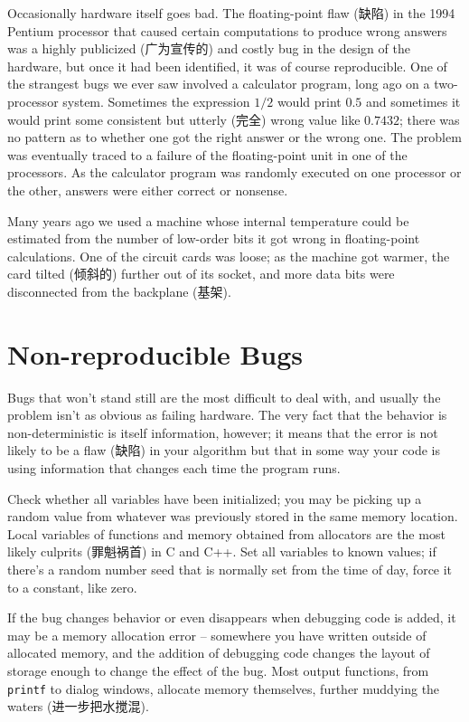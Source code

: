 Occasionally hardware itself goes bad. The floating-point flaw (缺陷) in
the 1994 Pentium processor that caused certain computations to produce
wrong answers was a highly publicized (广为宣传的) and costly bug in the
design of the hardware, but once it had been identified, it was of course
reproducible.  One of the strangest bugs we ever saw involved a calculator
program, long ago on a two-processor system.  Sometimes the expression
$1/2$ would print $0.5$ and sometimes it would print some consistent but
utterly (完全) wrong value like $0.7432$; there was no pattern as to
whether one got the right answer or the wrong one. The problem was
eventually traced to a failure of the floating-point unit in one of the
processors. As the calculator program was randomly executed on one
processor or the other, answers were either correct or nonsense.

Many years ago we used a machine whose internal temperature could be
estimated from the number of low-order bits it got wrong in floating-point
calculations. One of the circuit cards was loose; as the machine got
warmer, the card tilted (倾斜的) further out of its socket, and more data
bits were disconnected from the backplane (基架).

\section{Non-reproducible Bugs}

Bugs that won't stand still are the most difficult to deal with, and
usually the problem isn't as obvious as failing hardware. The very fact
that the behavior is non-deterministic is itself information, however; it
means that the error is not likely to be a flaw (缺陷) in your algorithm
but that in some way your code is using information that changes each time
the program runs.

Check whether all variables have been initialized; you may be picking up a
random value from whatever was previously stored in the same memory
location.  Local variables of functions and memory obtained from allocators
are the most likely culprits (罪魁祸首) in C and C++. Set all variables to
known values; if there's a random number seed that is normally set from the
time of day, force it to a constant, like zero.

If the bug changes behavior or even disappears when debugging code is
added, it may be a memory allocation error -- somewhere you have written
outside of allocated memory, and the addition of debugging code changes the
layout of storage enough to change the effect of the bug. Most output
functions, from \verb'printf' to dialog windows, allocate memory
themselves, further muddying the waters (进一步把水搅混).

